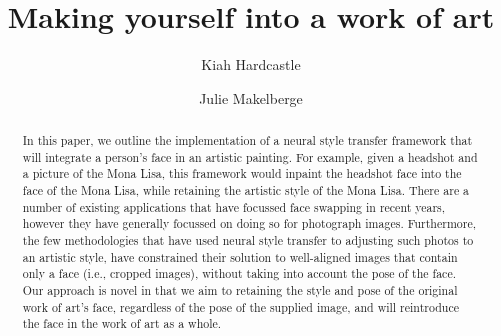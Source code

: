 \documentclass{pnastwo2}
\begin{document}
\title{Making yourself into a work of art}

\author{Kiah Hardcastle
\and Julie Makelberge}


\maketitle

\begin{article}

\begin{abstract}

In this paper, we outline the implementation of a neural style transfer framework that will integrate a person's face in an artistic painting. For example, given a headshot and a picture of the Mona Lisa, this framework would inpaint the headshot face into the face of the Mona Lisa, while retaining the artistic style of the Mona Lisa. There are a number of existing applications that have focussed face swapping in recent years, however they have generally focussed on doing so for photograph images. Furthermore, the few methodologies that have used neural style transfer to adjusting such photos to an artistic style, have constrained their solution to well-aligned images that contain only a face (i.e., cropped images), without taking into account the pose of the face. Our approach is novel in that we aim to retaining the style and pose of the original work of art's face, regardless of the pose of the supplied image, and will reintroduce the face in the work of art as a whole. 

\end{abstract}


\end{article}
\end{document}
